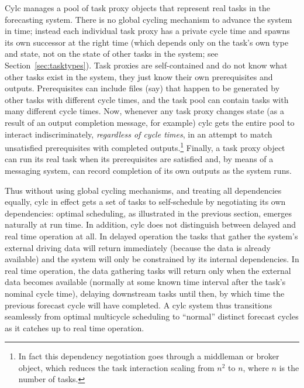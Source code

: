 \documentclass[11pt,a4paper]{article}
\begin{document}
Cylc manages a pool of task proxy objects that represent real tasks in
the forecasting system. There is no global cycling mechanism to advance
the system in time; instead each individual task proxy has a private
cycle time and spawns its own successor at the right time (which depends
only on the task's own type and state, not on the state of other tasks
in the system; see Section~\ref{sec:tasktypes}). Task
proxies are self-contained and do not know what other tasks exist in the
system, they just know their own prerequisites and outputs.
Prerequisites can include files (say) that happen to be generated by
other tasks with different cycle times, and the task pool can contain
tasks with many different cycle times.  Now, whenever any task proxy
changes state (as a result of an output completion message, for example)
cylc gets the entire pool to interact indiscriminately, {\em regardless
of cycle times}, in an attempt to match unsatisfied prerequisites with
completed outputs.\footnote{In fact this dependency negotiation goes
through a middleman or broker object, which reduces the task interaction
scaling from $n^2$ to $n$, where $n$ is the number of tasks.} Finally, a
task proxy object can run its real task when its prerequisites are
satisfied and, by means of a messaging system, can record completion of
its own outputs as the system runs. 

Thus without using global cycling mechanisms, and treating all
dependencies equally, cylc in effect gets a set of tasks to
self-schedule by negotiating its own dependencies: optimal scheduling,
as illustrated in the previous section, emerges naturally at run time.
In addition, cylc does not distinguish between delayed and real time
operation at all. In delayed operation the tasks that gather the
system's external driving data will return immediately (because the data
is already available) and the system will only be constrained by its
internal dependencies. In real time operation, the data gathering tasks
will return only when the external data becomes available (normally at
some known time interval after the task's nominal cycle time), delaying
downstream tasks until then, by which time the previous forecast cycle
will have completed. A cylc system thus transitions seamlessly from
optimal multicycle scheduling to ``normal'' distinct forecast cycles as
it catches up to real time operation.
\end{document}
